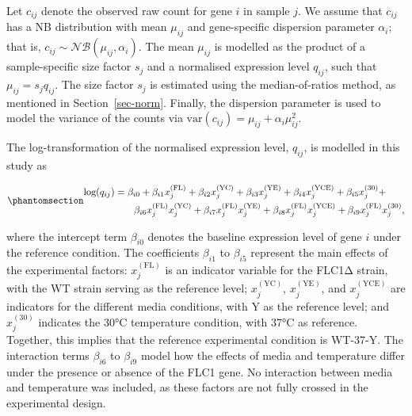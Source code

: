 \documentclass[
  a4paper,
]{scrreprt}
\begin{document}
Let \(c_{ij}\) denote the observed raw count for gene \(i\) in sample
\(j\). We assume that \(c_{ij}\) has a NB distribution with mean
\(\mu_{ij}\) and gene-specific dispersion parameter \(\alpha_i\); that
is, \(c_{ij} \sim \mathcal{NB}(\mu_{ij}, \alpha_i)\). The mean
\(\mu_{ij}\) is modelled as the product of a sample-specific size factor
\(s_j\) and a normalised expression level \(q_{ij}\), such that
\(\mu_{ij} = s_j q_{ij}\). The size factor \(s_j\) is estimated using
the median-of-ratios method, as mentioned in Section~\ref{sec-norm}.
Finally, the dispersion parameter is used to model the variance of the
counts via \(\text{var}(c_{ij}) = \mu_{ij}+\alpha_i\mu_{ij}^2\).

The log-transformation of the normalised expression level, \(q_{ij}\),
is modelled in this study as

\begin{equation}\phantomsection\label{eq-glm}{
\begin{aligned}
\text{log}(q_{ij}) &= \beta_{i0} + \beta_{i1}x^{(\text{FL})}_{j} + \beta_{i2}x^{(\text{YC})}_{j} + \beta_{i3}x^{(\text{YE})}_{j} + \beta_{i4}x^{(\text{YCE})}_{j} + \beta_{i5}x^{(\text{30})}_{j} + \\
& \quad \quad \beta_{i6}x^{(\text{FL})}_{j}x^{(\text{YC})}_{j} + \beta_{i7}x^{(\text{FL})}_{j}x^{(\text{YE})}_{j} + \beta_{i8}x^{(\text{FL})}_{j}x^{(\text{YCE})}_{j} + \beta_{i9}x^{(\text{FL})}_{j}x^{(\text{30})}_{j},
\end{aligned}
}\end{equation}

where the intercept term \(\beta_{i0}\) denotes the baseline expression
level of gene \(i\) under the reference condition. The coefficients
\(\beta_{i1}\) to \(\beta_{i5}\) represent the main effects of the
experimental factors: \(x^{(\text{FL})}_{j}\) is an indicator variable
for the FLC1Δ strain, with the WT strain serving as the reference level;
\(x^{(\text{YC})}_{j}\), \(x^{(\text{YE})}_{j}\), and
\(x^{(\text{YCE})}_{j}\) are indicators for the different media
conditions, with Y as the reference level; and \(x^{(\text{30})}_{j}\)
indicates the 30°C temperature condition, with 37°C as reference.
Together, this implies that the reference experimental condition is
WT-37-Y. The interaction terms \(\beta_{i6}\) to \(\beta_{i9}\) model
how the effects of media and temperature differ under the presence or
absence of the FLC1 gene. No interaction between media and temperature
was included, as these factors are not fully crossed in the experimental
design.
\end{document}
